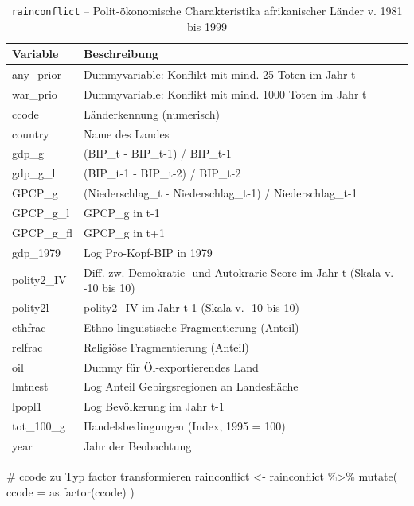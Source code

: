 \documentclass[
  a4paper,
  DIV=11,
  oneside]{scrreprt}
\newenvironment{Shaded}{\begin{snugshade}}{\end{snugshade}}
\newcommand{\AttributeTok}[1]{\textcolor[rgb]{0.40,0.45,0.13}{#1}}
\newcommand{\CommentTok}[1]{\textcolor[rgb]{0.37,0.37,0.37}{#1}}
\newcommand{\FunctionTok}[1]{\textcolor[rgb]{0.28,0.35,0.67}{#1}}
\newcommand{\NormalTok}[1]{\textcolor[rgb]{0.00,0.23,0.31}{#1}}
\newcommand{\OtherTok}[1]{\textcolor[rgb]{0.00,0.23,0.31}{#1}}
\newcommand{\SpecialCharTok}[1]{\textcolor[rgb]{0.37,0.37,0.37}{#1}}
\begin{document}
\begin{longtable}{ll}

\caption{\label{tbl-rainconfdata}\texttt{rainconflict} --
Polit-ökonomische Charakteristika afrikanischer Länder v. 1981 bis 1999}

\tabularnewline

\toprule
Variable & Beschreibung \\ 
\midrule\addlinespace[2.5pt]
any\_prior & Dummyvariable: Konflikt mit mind. 25 Toten im Jahr t \\ 
war\_prio & Dummyvariable: Konflikt mit mind. 1000 Toten im Jahr t \\ 
ccode & Länderkennung (numerisch) \\ 
country & Name des Landes \\ 
gdp\_g & (BIP\_t - BIP\_t-1) / BIP\_t-1 \\ 
gdp\_g\_l & (BIP\_t-1 - BIP\_t-2) / BIP\_t-2 \\ 
GPCP\_g & (Niederschlag\_t - Niederschlag\_t-1) / Niederschlag\_t-1 \\ 
GPCP\_g\_l & GPCP\_g in t-1 \\ 
GPCP\_g\_fl & GPCP\_g in t+1 \\ 
gdp\_1979 & Log Pro-Kopf-BIP in 1979 \\ 
polity2\_IV & Diff. zw. Demokratie- und Autokrarie-Score im Jahr t (Skala v. -10 bis 10) \\ 
polity2l & polity2\_IV im Jahr t-1 (Skala v. -10 bis 10) \\ 
ethfrac & Ethno-linguistische Fragmentierung (Anteil) \\ 
relfrac & Religiöse Fragmentierung (Anteil) \\ 
oil & Dummy für Öl-exportierendes Land \\ 
lmtnest & Log Anteil Gebirgsregionen an Landesfläche \\ 
lpopl1 & Log Bevölkerung im Jahr t-1 \\ 
tot\_100\_g & Handelsbedingungen (Index, 1995 = 100) \\ 
year & Jahr der Beobachtung \\ 
\bottomrule

\end{longtable}

\begin{Shaded}
\begin{Highlighting}[]
\CommentTok{\# ccode zu Typ \textquotesingle{}factor\textquotesingle{} transformieren}
\NormalTok{rainconflict }\OtherTok{\textless{}{-}}\NormalTok{ rainconflict }\SpecialCharTok{\%\textgreater{}\%} 
  \FunctionTok{mutate}\NormalTok{(}
    \AttributeTok{ccode =} \FunctionTok{as.factor}\NormalTok{(ccode)}
\NormalTok{  )}
\end{Highlighting}
\end{Shaded}
\end{document}
